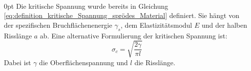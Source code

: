 \documentclass[11pt,a4paper]{article}
\numberwithin{equation}{section}
\numberwithin{figure}{section}
\begin{document}
\\
\begin{addmargin}[25pt]{0pt}
Die kritische Spannung wurde bereits in Gleichung \ref{eq:definition_kritische_Spannung_sprödes_Material} definiert. Sie hängt von der spezifischen Bruchflächenenergie $\gamma_s$, dem Elastizitätsmodul $E$ und der halben Risslänge $a$ ab. Eine alternative Formulierung der kritischen Spannung ist:
\begin{equation}\label{eq:kritische_Spannung_alternativ}
    \sigma_c = \sqrt{\frac{2\gamma}{\pi l }}
\end{equation}
Dabei ist $\gamma$ die Oberflächenspannung und $l$ die Risslänge.\\
\end{addmargin}
\end{document}

